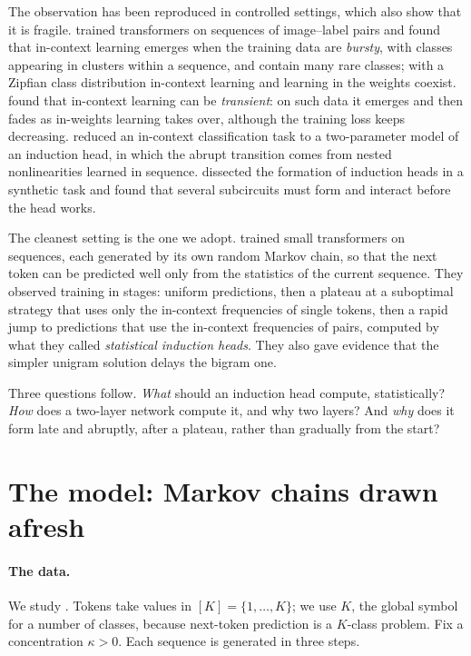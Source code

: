 \begin{refsection}
The observation has been reproduced in controlled settings, which also show that it is fragile. \Textcite{ChanEtAl2022} trained transformers on sequences of image--label pairs and found that in-context learning emerges when the training data are \emph{bursty}, with classes appearing in clusters within a sequence, and contain many rare classes; with a Zipfian class distribution in-context learning and learning in the weights coexist. \Textcite{SinghEtAl2023} found that in-context learning can be \emph{transient}: on such data it emerges and then fades as in-weights learning takes over, although the training loss keeps decreasing. \Textcite{Reddy2024} reduced an in-context classification task to a two-parameter model of an induction head, in which the abrupt transition comes from nested nonlinearities learned in sequence. \Textcite{SinghEtAl2024} dissected the formation of induction heads in a synthetic task and found that several subcircuits must form and interact before the head works.

The cleanest setting is the one we adopt. \Textcite{EdelmanEtAl2024} trained small transformers on sequences, each generated by its own random Markov chain, so that the next token can be predicted well only from the statistics of the current sequence. They observed training in stages: uniform predictions, then a plateau at a suboptimal strategy that uses only the in-context frequencies of single tokens, then a rapid jump to predictions that use the in-context frequencies of pairs, computed by what they called \emph{statistical induction heads}. They also gave evidence that the simpler unigram solution delays the bigram one.

Three questions follow. \emph{What} should an induction head compute, statistically? \emph{How} does a two-layer network compute it, and why two layers? And \emph{why} does it form late and abruptly, after a plateau, rather than gradually from the start?

\section{The model: Markov chains drawn afresh}\label{sec:induction:model}

\paragraph{The data.} We study . Tokens take values in $[K]=\{1,\dots,K\}$; we use $K$, the global symbol for a number of classes, because next-token prediction is a $K$-class problem. Fix a concentration $\kappa>0$. Each sequence is generated in three steps.


\end{refsection}
